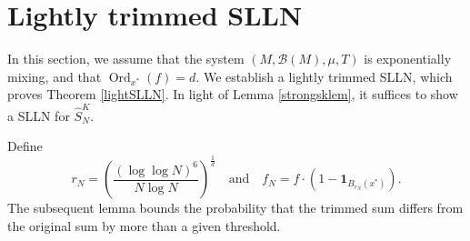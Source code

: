 \documentclass[11pt,twoside,a4paper,reqno]{amsart}
\newcommand{\Ord}{\operatorname{Ord}}
\def\one{{\mathbf{1}}}
\begin{document}
\section{Lightly trimmed SLLN}\label{LT}
In this section, we assume that the system $(M, \mathcal{B}(M), \mu, T)$ is exponentially mixing, and that $\Ord_{x^*}(f) = d$. We establish a lightly trimmed SLLN, which proves Theorem \ref{lightSLLN}. In light of Lemma \ref{strongsklem}, it suffices to show a SLLN for $\hat{S}_N^K$.




Define
$$
r_N=\left(\frac{(\log \log N)^6}{N \log N}\right)^{\frac{1}{d}}\quad \text{and}\quad f_N=f \cdot \left(1-\one_{B_{r_N}(x^*)}\right).
$$
The subsequent lemma bounds the probability that the trimmed sum differs from the original sum by more than a given threshold.
\end{document}
